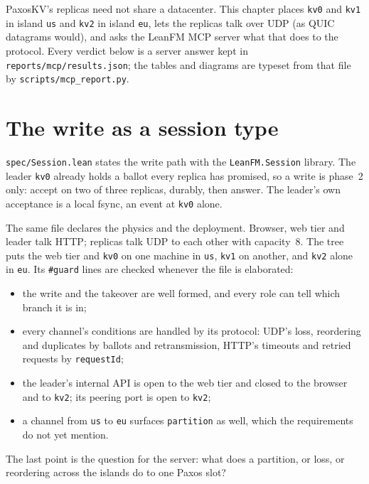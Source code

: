 PaxosKV's replicas need not share a datacenter. This chapter places
\texttt{kv0} and \texttt{kv1} in island \texttt{us} and \texttt{kv2} in island
\texttt{eu}, lets the replicas talk over UDP (as QUIC datagrams would), and asks
the LeanFM MCP server what that does to the protocol. Every verdict below is a
server answer kept in \texttt{reports/mcp/results.json}; the tables and
diagrams are typeset from that file by \texttt{scripts/mcp\_report.py}.

\section{The write as a session type}
\texttt{spec/Session.lean} states the write path with the
\texttt{LeanFM.Session} library. The leader \texttt{kv0} already holds a ballot
every replica has promised, so a write is phase~2 only: accept on two of three
replicas, durably, then answer. The leader's own acceptance is a local fsync, an
event at \texttt{kv0} alone.



The same file declares the physics and the deployment. Browser, web tier and
leader talk HTTP; replicas talk UDP to each other with capacity~8. The tree puts
the web tier and \texttt{kv0} on one machine in \texttt{us}, \texttt{kv1} on
another, and \texttt{kv2} alone in \texttt{eu}. Its \texttt{\#guard} lines are
checked whenever the file is elaborated:

\begin{itemize}\tightlist
\item the write and the takeover are well formed, and every role can tell which
  branch it is in;
\item every channel's conditions are handled by its protocol: UDP's loss,
  reordering and duplicates by ballots and retransmission, HTTP's timeouts and
  retried requests by \texttt{requestId};
\item the leader's internal API is open to the web tier and closed to the
  browser and to \texttt{kv2}; its peering port is open to \texttt{kv2};
\item a channel from \texttt{us} to \texttt{eu} surfaces \texttt{partition} as
  well, which the requirements do not yet mention.
\end{itemize}

The last point is the question for the server: what does a partition, or loss,
or reordering across the islands do to one Paxos slot?

